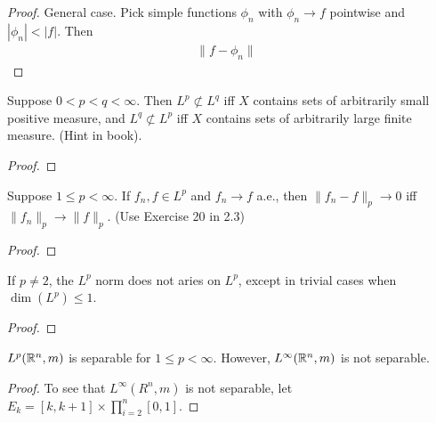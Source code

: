 \documentclass{article}
\begin{document}
\begin{proof}
General case. Pick simple functions $\phi_n$ with $\phi_n \to f$ pointwise and $|\phi_n| < |f|$. Then
\begin{align*}
\|f - \phi_n\| & 
\end{align*} 

\end{proof}


 Suppose $0 < p < q < \infty$. Then $L^p \not\subset L^q$ iff $X$ contains sets of arbitrarily small positive measure, and $L^q \not \subset L^p$ iff $X$ contains sets of arbitrarily large finite measure. (Hint in book).
\begin{proof}

\end{proof}

 Suppose $1 \le p < \infty$. If $f_n, f \in L^p$ and $f_n \to f$ a.e., then $\|f_n - f\|_p \to 0$ iff $\|f_n\|_p \to \|f\|_p$. (Use Exercise 20 in 2.3)
\begin{proof}

\end{proof}

 If $p \neq 2$, the $L^p$ norm does not aries on $L^p$, except in trivial cases when $\dim(L^p) \le 1$.
\begin{proof}

\end{proof}

 $L^p(\mathbb{R}^n, m)$ is separable for $1 \le p < \infty$. However, $L^\infty(\mathbb{R}^n, m)$ is not separable.
\begin{proof}
To see that $L^\infty(R^n, m)$ is not separable, let $E_k = [k, k+1] \times \prod_{i=2}^n [0,1]$. 


\end{proof}
\end{document}
